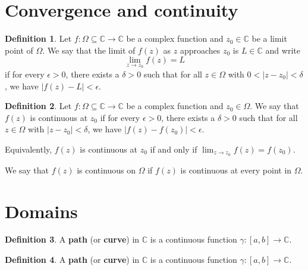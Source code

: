 \documentclass[12pt,openany]{book}
\theoremstyle{definition}
\newtheorem{definition}{Definition}[chapter]
\newcommand{\C}{\mathbb{C}}
\begin{document}
	\section{Convergence and continuity}
	
	\begin{tcolorbox}[colback=white,colframe=defcolor,arc=5pt,title={\color{white}\bf Limit of Complex function}]
		\begin{definition}
			Let $f: \Omega \subseteq \mathbb{C} \rightarrow \mathbb{C}$ be a complex function and $z_0 \in \mathbb{C}$ be a limit point of $\Omega$. We say that the limit of $f(z)$ as $z$ approaches $z_0$ is $L \in \mathbb{C}$ and write
			\[ \lim_{z \to z_0} f(z) = L \]
			if for every $\epsilon > 0$, there exists a $\delta > 0$ such that for all $z \in \Omega$ with $0 < |z - z_0| < \delta$, we have $|f(z) - L| < \epsilon$.
		\end{definition}
	\end{tcolorbox}
	
	\begin{tcolorbox}[colback=white,colframe=defcolor,arc=5pt,title={\color{white}\bf Continuity of Complex function}]
		\begin{definition}
			Let $f: \Omega \subseteq \mathbb{C} \rightarrow \mathbb{C}$ be a complex function and $z_0 \in \Omega$. We say that $f(z)$ is continuous at $z_0$ if for every $\epsilon > 0$, there exists a $\delta > 0$ such that for all $z \in \Omega$ with $|z - z_0| < \delta$, we have $|f(z) - f(z_0)| < \epsilon$.
			
			Equivalently, $f(z)$ is continuous at $z_0$ if and only if $\lim_{z \to z_0} f(z) = f(z_0)$.
			
			We say that $f(z)$ is continuous on $\Omega$ if $f(z)$ is continuous at every point in $\Omega$.
		\end{definition}
	\end{tcolorbox}
	
	\newpage
	\section{Domains}
	\begin{tcolorbox}[title=Path; Curve; Contour;]
		\begin{definition}
			A \textbf{path} (or \textbf{curve}) in $\C$ is a continuous function $\gamma:[a,b]\to\C$.
		\end{definition}
	\end{tcolorbox}
	
	\begin{tcolorbox}[title=Stepwise Path;]
		\begin{definition}
			A \textbf{path} (or \textbf{curve}) in $\C$ is a continuous function $\gamma:[a,b]\to\C$.
		\end{definition}
	\end{tcolorbox}
	
\end{document}
